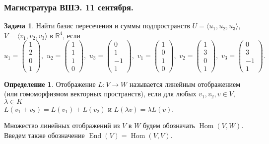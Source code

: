 \documentclass[12pt, fleqn]{extarticle}
\newcommand{\real}{\mathbb{R}}
\DeclareMathOperator{\Hom}{Hom}
\DeclareMathOperator{\End}{End}
\theoremstyle{definition}
\newtheorem{definition}{Определение}
\newtheorem{problem}{Задача}
\theoremstyle{remark}
\begin{document}
\clearpage

\thispagestyle{empty}
\subsubsection*{Магистратура ВШЭ. 11 сентября.}

\begin{problem}
Найти базис пересечения и суммы подпространств 
$U=\langle u_1,u_2,u_3\rangle$, $V=\langle v_1,v_2,v_3\rangle$ в $\real^4$, если
$$
u_1=\left(\begin{matrix}
1 \\2\\ 0\\ 1 
\end{matrix}\right),\,\,
u_2=\left(\begin{matrix}
1\\ 1\\ 1\\ 0
\end{matrix}\right),\,\,
u_3=\left(\begin{matrix}
0\\ 1\\ -1\\ 1 
\end{matrix}\right),\,\,
v_1=\left(\begin{matrix}
1\\ 0\\ 1\\  0
\end{matrix}\right),\,\,
v_2=\left(\begin{matrix}
1 \\3 \\0 \\1
\end{matrix}\right),\,\,
v_3=\left(\begin{matrix}
0 \\3 \\-1 \\1
\end{matrix}\right).
$$
\end{problem}

\begin{definition}
Отображение $L: V \rightarrow W$ называется линейным отображением
(или гомоморфизмом векторных пространств), если для любых $v_{1}, v_{2}, v \in V$,
$\lambda \in K$\\
$L(v_{1} + v_{2}) = L(v_{1}) + L(v_{2})$ и $L(\lambda v) = \lambda L(v)$.

Множество линейных отображений из $V$ в $W$ будем обозначать $\Hom(V, W)$. 
Введем также обозначение $\End(V) = \Hom(V, V)$.
\end{definition}
\end{document}

